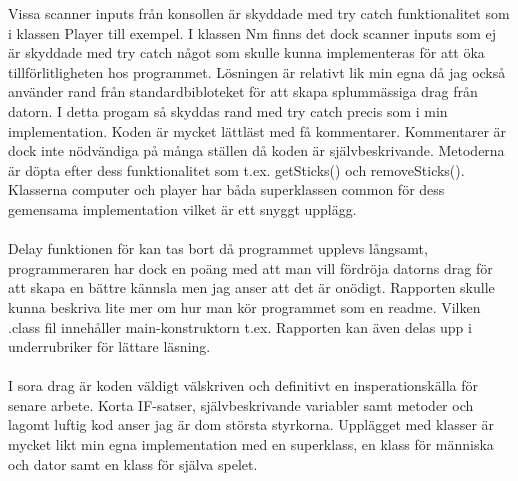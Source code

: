 \documentclass[hidelinks]{article}
\begin{document}
Vissa scanner inputs från konsollen är skyddade med try catch funktionalitet som i klassen Player till exempel. I klassen Nm finns det dock scanner inputs som ej är skyddade med try catch något som skulle kunna implementeras för att öka tillförlitligheten hos programmet. Lösningen är relativt lik min egna då jag också använder rand från standardbibloteket för att skapa splummässiga drag från datorn. I detta progam så skyddas rand med try catch precis som i min implementation.
Koden är mycket lättläst med få kommentarer. Kommentarer är dock inte nödvändiga på många ställen då koden är självbeskrivande. Metoderna är döpta efter dess funktionalitet som t.ex. getSticks() och removeSticks(). Klasserna computer och player har båda superklassen common för dess gemensama implementation vilket är ett snyggt upplägg.
\\ \\
Delay funktionen för kan tas bort då programmet upplevs långsamt, programmeraren har dock en poäng med att man vill fördröja datorns drag för att skapa en bättre kännsla men jag anser att det är onödigt. Rapporten skulle kunna beskriva lite mer om hur man kör programmet som en readme. Vilken .class fil innehåller main-konstruktorn t.ex. Rapporten kan även delas upp i underrubriker för lättare läsning.
\\ \\
I sora drag är koden väldigt välskriven och definitivt en insperationskälla för senare arbete. Korta IF-satser, självbeskrivande variabler samt metoder och lagomt luftig kod anser jag är dom största styrkorna. Upplägget med klasser är mycket likt min egna implementation med en superklass, en klass för människa och dator samt en klass för själva spelet.  
\end{document}

